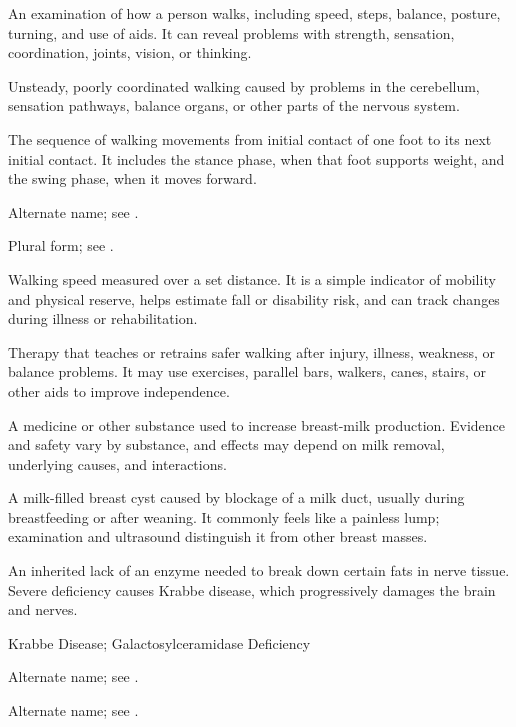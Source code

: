  An examination of how a person walks, including speed, steps, balance, posture, turning, and use of aids. It can reveal problems with strength, sensation, coordination, joints, vision, or thinking.

 Unsteady, poorly coordinated walking caused by problems in the cerebellum, sensation pathways, balance organs, or other parts of the nervous system.

 The sequence of walking movements from initial contact of one foot to its next initial contact. It includes the stance phase, when that foot supports weight, and the swing phase, when it moves forward.

 Alternate name; see .

 Plural form; see .

 Walking speed measured over a set distance. It is a simple indicator of mobility and physical reserve, helps estimate fall or disability risk, and can track changes during illness or rehabilitation.

 Therapy that teaches or retrains safer walking after injury, illness, weakness, or balance problems. It may use exercises, parallel bars, walkers, canes, stairs, or other aids to improve independence.

 A medicine or other substance used to increase breast-milk production. Evidence and safety vary by substance, and effects may depend on milk removal, underlying causes, and interactions.

 A milk-filled breast cyst caused by blockage of a milk duct, usually during breastfeeding or after weaning. It commonly feels like a painless lump; examination and ultrasound distinguish it from other breast masses.

 An inherited lack of an enzyme needed to break down certain fats in nerve tissue. Severe deficiency causes Krabbe disease, which progressively damages the brain and nerves.

\synonyms
Krabbe Disease; Galactosylceramidase Deficiency

 Alternate name; see .

 Alternate name; see .

